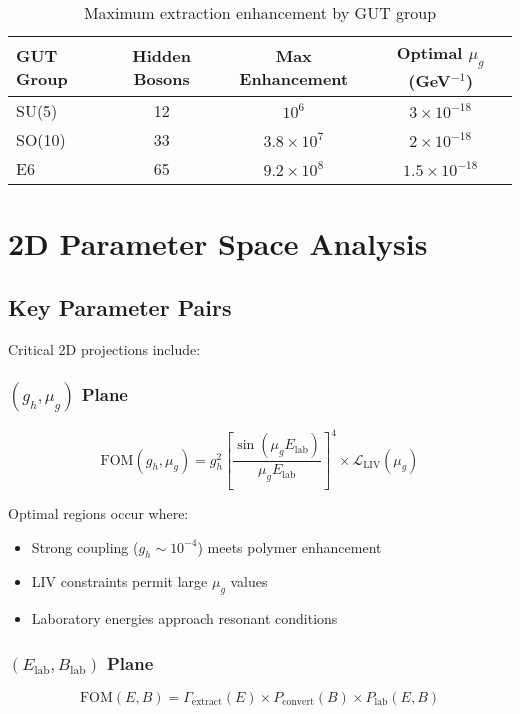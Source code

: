\documentclass[11pt]{article}
\begin{document}
\begin{table}[h]
\centering
\begin{tabular}{lccc}
\toprule
\textbf{GUT Group} & \textbf{Hidden Bosons} & \textbf{Max Enhancement} & \textbf{Optimal $\mu_g$ (GeV$^{-1}$)} \\
\midrule
SU(5) & 12 & $10^6$ & $3 \times 10^{-18}$ \\
SO(10) & 33 & $3.8 \times 10^7$ & $2 \times 10^{-18}$ \\
E6 & 65 & $9.2 \times 10^8$ & $1.5 \times 10^{-18}$ \\
\bottomrule
\end{tabular}
\caption{Maximum extraction enhancement by GUT group}
\end{table}

\section{2D Parameter Space Analysis}

\subsection{Key Parameter Pairs}

Critical 2D projections include:

\subsubsection{$(g_h, \mu_g)$ Plane}
\begin{equation}
\text{FOM}(g_h, \mu_g) = g_h^2 \left[\frac{\sin(\mu_g E_{\text{lab}})}{\mu_g E_{\text{lab}}}\right]^4 \times \mathcal{L}_{\text{LIV}}(\mu_g)
\end{equation}

Optimal regions occur where:
\begin{itemize}
    \item Strong coupling ($g_h \sim 10^{-4}$) meets polymer enhancement
    \item LIV constraints permit large $\mu_g$ values
    \item Laboratory energies approach resonant conditions
\end{itemize}

\subsubsection{$(E_{\text{lab}}, B_{\text{lab}})$ Plane}
\begin{equation}
\text{FOM}(E, B) = \Gamma_{\text{extract}}(E) \times P_{\text{convert}}(B) \times P_{\text{lab}}(E,B)
\end{equation}
\end{document}
